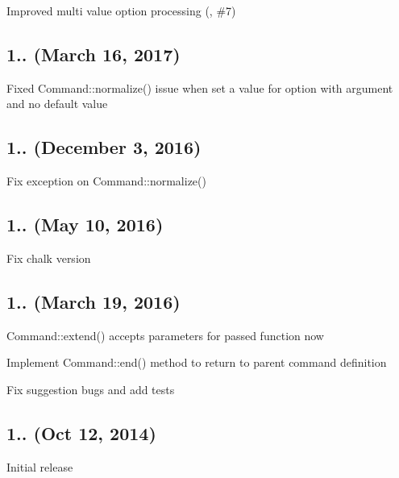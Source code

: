 
\begin{DoxyItemize}
\item Improved multi value option processing (, \#7)
\end{DoxyItemize}

\subsection*{1.. (March 16, 2017)}


\begin{DoxyItemize}
\item Fixed {\ttfamily Command\+::normalize()} issue when set a value for option with argument and no default value
\end{DoxyItemize}

\subsection*{1.. (December 3, 2016)}


\begin{DoxyItemize}
\item Fix exception on {\ttfamily Command\+::normalize()}
\end{DoxyItemize}

\subsection*{1.. (May 10, 2016)}


\begin{DoxyItemize}
\item Fix {\ttfamily chalk} version
\end{DoxyItemize}

\subsection*{1.. (March 19, 2016)}


\begin{DoxyItemize}
\item {\ttfamily Command\+::extend()} accepts parameters for passed function now
\item Implement {\ttfamily Command\+::end()} method to return to parent command definition
\item Fix suggestion bugs and add tests
\end{DoxyItemize}

\subsection*{1.. (Oct 12, 2014)}


\begin{DoxyItemize}
\item Initial release 
\end{DoxyItemize}
